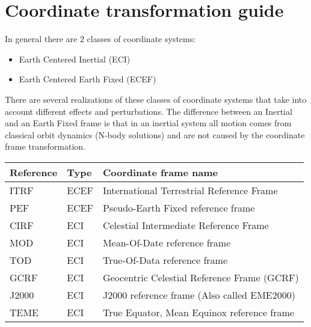 \documentclass[letterpaper,10pt,english]{sphinxmanual}
\begin{document}
\section{Coordinate transformation guide}
\label{\detokenize{introduction/conventions:coordinate-transformation-guide}}
In general there are 2 classes of coordinate systems:
\begin{itemize}
\item {} 
Earth Centered Inertial (ECI)

\item {} 
Earth Centered Earth Fixed (ECEF)

\end{itemize}

There are several realizations of these classes of coordinate systems that take into account different effects and perturbations. The difference between an Inertial and an Earth Fixed frame is that in an inertial system all motion comes from classical orbit dynamics (N-body solutions) and are not caused by the coordinate frame transformation.


\begin{savenotes}\sphinxattablestart
\centering
\begin{tabulary}{\linewidth}[t]{|T|T|T|}
\hline
\sphinxstyletheadfamily 
Reference
&\sphinxstyletheadfamily 
Type
&\sphinxstyletheadfamily 
Coordinate frame name
\\
\hline
ITRF
&
ECEF
&
International Terrestrial Reference Frame
\\
\hline
PEF
&
ECEF
&
Pseudo-Earth Fixed reference frame
\\
\hline
CIRF
&
ECI
&
Celestial Intermediate Reference Frame
\\
\hline
MOD
&
ECI
&
Mean-Of-Date reference frame
\\
\hline
TOD
&
ECI
&
True-Of-Data reference frame
\\
\hline
GCRF
&
ECI
&
Geocentric Celestial Reference Frame (GCRF)
\\
\hline
J2000
&
ECI
&
J2000 reference frame (Also called EME2000)
\\
\hline
TEME
&
ECI
&
True Equator, Mean Equinox reference frame
\\
\hline
\end{tabulary}
\par
\sphinxattableend\end{savenotes}

\end{document}
